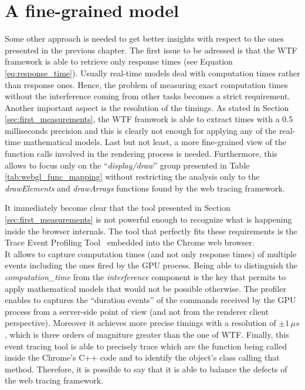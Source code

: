 \section{A fine-grained model}
Some other approach is needed to get better insights with respect to the ones
presented in the previous chapter. The first issue to be adressed is that the
WTF framework is able to retrieve only response times (see Equation
\ref{eq:response_time}). Usually real-time models deal with computation times
rather than response ones. Hence, the problem of measuring exact computation
times without the interference coming from other tasks becomes a strict requirement.
Another important aspect is the resolution of the timings. As stated in Section
\ref{sec:first_measurements}, the WTF framwork is able to extract times with a
0.5 milliseconds precision and this is clearly not enough for applying any of
the real-time mathematical models.
Last but not least, a more fine-grained view of the function calls involved in
the rendering process is needed. Furthermore, this allows to focus only on the
``\emph{display/draw}'' group presented in Table \ref{tab:webgl_func_mapping}
without restricting the analysis only to the \emph{drawElements} and
\emph{drawArrays} functions found by the web tracing framework.

It immediately become clear that the tool presented in Section \ref{sec:first_measurements}
is not powerful enough to recognize what is happening inside the browser internals.
The tool that perfectly fits these requirements is the Trace Event Profiling
Tool~\cite{eventprofilertool} embedded into the Chrome web browser.\\
It allows to capture computation times (and not only response times) of multiple
events including the ones fired by the GPU process. Being able to distinguish
the \emph{computation\_time} from the \emph{interference} component is the key
that permits to apply mathematical models that would not be possible otherwise.
The profiler enables to captures the ``duration events'' of the commands received by the GPU
process from a server-side point of view (and not from the renderer client perspective).
Moreover it achieves more precise timings with a resolution of \(\pm 1\,\mu s\),
which is three orders of magniture greater than the one of WTF.
Finally, this event tracing tool is able to precisely trace which are the function
being called inside the Chrome's C++ code and to identify the object's class
calling that method. Therefore, it is possible to say that it is able to balance
the defects of the web tracing framework.

